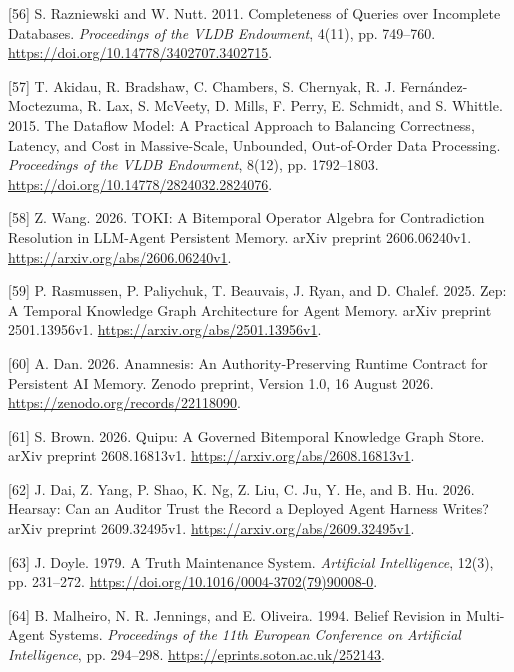 \documentclass[
  11pt,
]{article}
\newlength{\cslhangindent}
\newlength{\cslentryspacingunit} %
\newenvironment{CSLReferences}[2] %
 {%
  \setlength{\parindent}{0pt}
  \ifodd #1
  \let\oldpar\par
  \def\par{\hangindent=\cslhangindent\oldpar}
  \fi
  \setlength{\parskip}{#2\cslentryspacingunit}
 }%
 {}
\begin{document}
\begin{CSLReferences}{1}{1}
\leavevmode{}%
{[}56{]} S. Razniewski and W. Nutt. 2011. Completeness of Queries over
Incomplete Databases. \emph{Proceedings of the VLDB Endowment}, 4(11),
pp. 749--760. \url{https://doi.org/10.14778/3402707.3402715}.

\leavevmode{}%
{[}57{]} T. Akidau, R. Bradshaw, C. Chambers, S. Chernyak, R. J.
Fernández-Moctezuma, R. Lax, S. McVeety, D. Mills, F. Perry, E. Schmidt,
and S. Whittle. 2015. The Dataflow Model: A Practical Approach to
Balancing Correctness, Latency, and Cost in Massive-Scale, Unbounded,
Out-of-Order Data Processing. \emph{Proceedings of the VLDB Endowment},
8(12), pp. 1792--1803. \url{https://doi.org/10.14778/2824032.2824076}.

\leavevmode{}%
{[}58{]} Z. Wang. 2026. TOKI: A Bitemporal Operator Algebra for
Contradiction Resolution in LLM-Agent Persistent Memory. arXiv preprint
2606.06240v1. \url{https://arxiv.org/abs/2606.06240v1}.

\leavevmode{}%
{[}59{]} P. Rasmussen, P. Paliychuk, T. Beauvais, J. Ryan, and D.
Chalef. 2025. Zep: A Temporal Knowledge Graph Architecture for Agent
Memory. arXiv preprint 2501.13956v1.
\url{https://arxiv.org/abs/2501.13956v1}.

\leavevmode{}%
{[}60{]} A. Dan. 2026. Anamnesis: An Authority-Preserving Runtime
Contract for Persistent AI Memory. Zenodo preprint, Version 1.0, 16
August 2026. \url{https://zenodo.org/records/22118090}.

\leavevmode{}%
{[}61{]} S. Brown. 2026. Quipu: A Governed Bitemporal Knowledge Graph
Store. arXiv preprint 2608.16813v1.
\url{https://arxiv.org/abs/2608.16813v1}.

\leavevmode{}%
{[}62{]} J. Dai, Z. Yang, P. Shao, K. Ng, Z. Liu, C. Ju, Y. He, and B.
Hu. 2026. Hearsay: Can an Auditor Trust the Record a Deployed Agent
Harness Writes? arXiv preprint 2609.32495v1.
\url{https://arxiv.org/abs/2609.32495v1}.

\leavevmode{}%
{[}63{]} J. Doyle. 1979. A Truth Maintenance System. \emph{Artificial
Intelligence}, 12(3), pp. 231--272.
\url{https://doi.org/10.1016/0004-3702(79)90008-0}.

\leavevmode{}%
{[}64{]} B. Malheiro, N. R. Jennings, and E. Oliveira. 1994. Belief
Revision in Multi-Agent Systems. \emph{Proceedings of the 11th European
Conference on Artificial Intelligence}, pp. 294--298.
\url{https://eprints.soton.ac.uk/252143}.


\end{CSLReferences}
\end{document}
